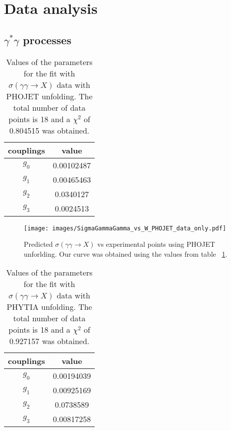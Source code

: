\documentclass[preprint, 12pt]{elsarticle}
\begin{document}
\section{Data analysis}



\subsection{$\gamma^{*} \gamma$ processes}

\begin{table}[b!]
\centering
\caption{Values of the parameters for the fit with $\sigma\left(\gamma \gamma \rightarrow X\right)$ data with PHOJET unfolding. The total number of data points is 18 and a $\chi^2$ of 0.804515 was obtained.}
\vspace{0.5cm}
\begin{tabular}{|c|c|}
\hline
couplings   & value \\
\hline
$g_0$  & 0.00102487\\ 
\hline
$g_1$  & 0.00465463 \\ 
\hline
$g_2$  & 0.0340127  \\
\hline
$g_3$  & 0.0024513\\ 
\hline
\end{tabular}
\label{table:SigmaGammaGamma_best_fit_PHOJET}
\end{table}

\begin{figure}[!h]
  \center
  \texttt{[image: images/SigmaGammaGamma\_vs\_W\_PHOJET\_data\_only.pdf]} 
  \caption{Predicted $\sigma\left(\gamma \gamma \rightarrow X\right)$ vs experimental points using PHOJET unforlding. Our curve was obtained using the values from table ~\ref{table:SigmaGammaGamma_best_fit_PHOJET}.}
\label{fig:SigmaGammaGamma_best_fit_PHOJET_data_only}
\end{figure}

\begin{table}[b!]
\centering
\caption{Values of the parameters for the fit with $\sigma\left(\gamma \gamma \rightarrow X\right)$ data with PHYTIA unfolding. The total number of data points is 18 and a $\chi^2$ of 0.927157 was obtained.}
\vspace{0.5cm}
\begin{tabular}{|c|c|}
\hline
couplings   & value \\
\hline
$g_0$  & 0.00194039 \\ 
\hline
$g_1$  & 0.00925169 \\ 
\hline
$g_2$  &  0.0738589 \\
\hline
$g_3$  &  0.00817258\\ 
\hline
\end{tabular}
\label{table:SigmaGammaGamma_best_fit_PHYTIA}
\end{table}
\end{document}
